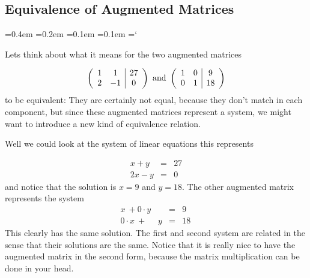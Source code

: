 \subsection*{Equivalence of Augmented Matrices}

{\ttfamily
{}\font=0.4em
\font=0.2em
\font=0.1em
\font=0.1em
\hyphenchar\font=`\-


\hypertarget{script_gaussian_elimination_background}{Lets think about what it means for the two augmented matrices} 


\[ \left( \begin{array}{cc | c}
1 & 1 & 27 \\
2 & -1 & 0  
\end{array} \right)
\mbox{ and } \left( \begin{array}{cc | c}
1 & 0 & 9 \\
0 & 1 & 18  
\end{array} \right)
\]
to be equivalent:
They are certainly not equal, because they don't match in each component, but since these augmented matrices represent a system, we might want to introduce a new kind of equivalence relation.

Well we could look at the system of linear equations this represents 

\begin{eqnarray*}
 x+y &=& 27\\
 2x - y &=& 0\, 
\end{eqnarray*}
and notice that the solution is $x=9$ and $y=18$. The other augmented matrix represents the system 
\begin{eqnarray*}
 x\ +0 \cdot y &=& 9\\
 0 \cdot x \ +\   \phantom{0 \cdot} y  &=& 18\, 
\end{eqnarray*}
This clearly has the same solution. The first and second system are related in the sense that their solutions are the same. Notice that it is really nice to have the augmented matrix in the second form, because the matrix multiplication can be done in your head.


}

